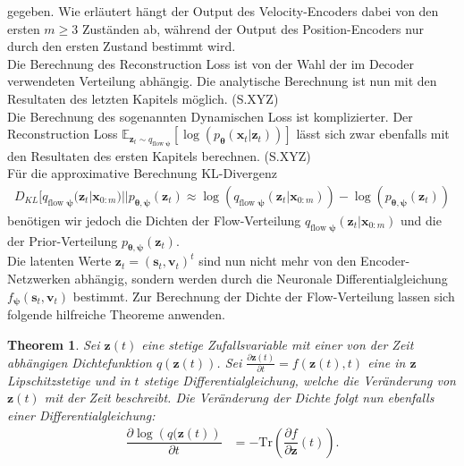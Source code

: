 \documentclass[12pt]{article}
\newcommand{\E}{\mathbb{E}}
\newtheorem{theorem}{Theorem}
\begin{document}
	gegeben. Wie erläutert hängt der Output des Velocity-Encoders dabei von den ersten $m\ge3$ Zuständen ab, während der Output des Position-Encoders nur durch den ersten Zustand bestimmt wird.\\
	Die Berechnung des Reconstruction Loss ist von der Wahl der im Decoder verwendeten Verteilung abhängig.
	Die analytische Berechnung ist nun mit den Resultaten des letzten Kapitels möglich. (S.XYZ)\\  
	Die Berechnung des sogenannten Dynamischen Loss ist komplizierter.
	Der Reconstruction Loss $\E_{\mathbf{z}_{t}\sim q_{\text{flow }\boldsymbol\psi}}
	\left[\log\left(p_{\boldsymbol\theta}\left(\mathbf{x}_{t}|\mathbf{z}_{t}\right)\right)\right] $ lässt sich zwar ebenfalls mit den Resultaten des ersten Kapitels berechnen. (S.XYZ) \\
	Für die approximative Berechnung KL-Divergenz 
	\begin{align*}
	D_{KL}\big[q_{\text{flow }\boldsymbol\psi}(\mathbf{z}_{t}|\mathbf{x}_{0:m})||p_{\boldsymbol\theta,\boldsymbol\psi}(\mathbf{z}_{t})\approx \log\left(q_{\text{flow }\boldsymbol\psi}(\mathbf{z}_{t}|\mathbf{x}_{0:m}) \right) - \log\left(p_{\boldsymbol\theta,\boldsymbol\psi}(\mathbf{z}_{t}) \right)
	\end{align*}
	benötigen wir jedoch die Dichten der Flow-Verteilung $q_{\text{flow }\boldsymbol\psi}(\mathbf{z}_{t}|\mathbf{x}_{0:m})$ und die der Prior-Verteilung $p_{\boldsymbol\theta,\boldsymbol\psi}(\mathbf{z}_{t})$.\\
	Die latenten Werte $\mathbf{z}_{t} = (\mathbf{s}_{t},\mathbf{v}_{t})^t$ sind nun nicht mehr von den Encoder-Netzwerken abhängig, sondern werden durch die Neuronale Differentialgleichung $f_{\boldsymbol\psi}(\mathbf{s}_{t},\mathbf{v}_{t})$ bestimmt. 
	Zur Berechnung der Dichte der Flow-Verteilung lassen sich folgende hilfreiche Theoreme anwenden.
	\begin{theorem}
	Sei $\mathbf{z}(t)$ eine stetige Zufallsvariable mit einer von der Zeit abhängigen Dichtefunktion $q(\mathbf{z}(t))$. Sei $\tfrac{\partial \mathbf{z}(t)}{\partial t}=f(\mathbf{z}(t),t)$ eine in $\mathbf{z}$ Lipschitzstetige und in $t$ stetige Differentialgleichung, welche die Veränderung von $\mathbf{z}(t)$ mit der Zeit beschreibt.
	Die Veränderung der Dichte folgt nun ebenfalls einer Differentialgleichung:
	\begin{align*}
	\dfrac{\partial \log\left(q(\mathbf{z}(t)\right)}{\partial t}&= - \mathrm{Tr}\left(\dfrac{\partial f}{\partial\mathbf{z}}(t)\right).
	\end{align*}
	\end{theorem}
\end{document}
